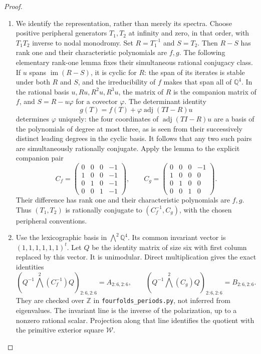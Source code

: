\documentclass[11pt,a4paper]{article}
\theoremstyle{definition}
\begin{document}
\begin{proof}
\begin{enumerate}[label=\arabic*.]
\item We identify the representation, rather than merely its spectra.
Choose positive peripheral generators $T_1,T_2$ at infinity and
zero, in that order, with $T_1T_2$ inverse to nodal monodromy.
Set $R=T_1^{-1}$ and $S=T_2$.  Then $R-S$ has rank one and their
characteristic polynomials are $f,g$.  The following elementary
rank-one lemma fixes their simultaneous rational conjugacy class.
If $u$ spans $\operatorname{im}(R-S)$, it is cyclic for $R$:
the span of its iterates is stable under both $R$ and $S$, and
the irreducibility of $f$ makes that span all of $\mathbb Q^4$.
In the rational basis $u,Ru,R^2u,R^3u$, the matrix of $R$ is
the companion matrix of $f$, and $S=R-u\varphi$ for a covector
$\varphi$.  The determinant identity
\[
 g(T)=f(T)+\varphi\operatorname{adj}(TI-R)u
 \tag{F.9}\label{maps:eq:F.9}
\]
determines $\varphi$ uniquely: the four coordinates of
$\operatorname{adj}(TI-R)u$ are a basis of the polynomials of
degree at most three, as is seen from their successively distinct
leading degrees in the cyclic basis.  It follows that any two
such pairs are simultaneously rationally conjugate.  Apply the
lemma to the explicit companion pair
\[
 C_f=\begin{pmatrix}
 0&0&0&-1\\1&0&0&-1\\0&1&0&-1\\0&0&1&-1
 \end{pmatrix},\qquad
 C_g=\begin{pmatrix}
 0&0&0&-1\\1&0&0&0\\0&1&0&0\\0&0&1&0
 \end{pmatrix}.
 \tag{F.10}\label{maps:eq:F.10}
\]
Their difference has rank one and their characteristic polynomials
are $f,g$.  Thus $(T_1,T_2)$ is rationally conjugate to
$(C_f^{-1},C_g)$, with the chosen peripheral conventions.

\item Use the lexicographic basis in $\bigwedge^2\mathbb Q^4$.
Its common invariant vector is $(1,1,1,1,1,1)^t$.
Let $Q$ be the identity matrix of size six with first column
replaced by this vector.  It is unimodular.  Direct multiplication
gives the exact identities
\[
 \left(Q^{-1}\bigwedge^2(C_f^{-1})Q\right)_{2:6,2:6}
   =A_{2:6,2:6},\qquad
 \left(Q^{-1}\bigwedge^2(C_g)Q\right)_{2:6,2:6}
   =B_{2:6,2:6}.
 \tag{F.11}\label{maps:eq:F.11}
\]
They are checked over $\mathbb Z$ in
\texttt{fourfolds\_periods.py}, not inferred from eigenvalues.
The invariant line is the inverse of the polarization, up to a
nonzero rational scalar.  Projection along that line identifies
the quotient with the primitive exterior square $\mathcal W$.


\end{enumerate}
\end{proof}
\end{document}
